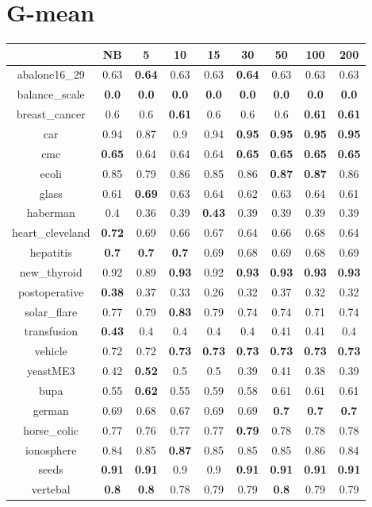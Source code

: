 \documentclass{article}%
\begin{document}
%
\section*{G{-}mean}%
\begin{tabular}{c|cccccccc}%
\hline%
&NB&5&10&15&30&50&100&200\\%
\hline%
abalone16\_29&0.63&\textbf{0.64}&0.63&0.63&\textbf{0.64}&0.63&0.63&0.63\\%
\hline%
balance\_scale&\textbf{0.0}&\textbf{0.0}&\textbf{0.0}&\textbf{0.0}&\textbf{0.0}&\textbf{0.0}&\textbf{0.0}&\textbf{0.0}\\%
\hline%
breast\_cancer&0.6&0.6&\textbf{0.61}&0.6&0.6&0.6&\textbf{0.61}&\textbf{0.61}\\%
\hline%
car&0.94&0.87&0.9&0.94&\textbf{0.95}&\textbf{0.95}&\textbf{0.95}&\textbf{0.95}\\%
\hline%
cmc&\textbf{0.65}&0.64&0.64&0.64&\textbf{0.65}&\textbf{0.65}&\textbf{0.65}&\textbf{0.65}\\%
\hline%
ecoli&0.85&0.79&0.86&0.85&0.86&\textbf{0.87}&\textbf{0.87}&0.86\\%
\hline%
glass&0.61&\textbf{0.69}&0.63&0.64&0.62&0.63&0.64&0.61\\%
\hline%
haberman&0.4&0.36&0.39&\textbf{0.43}&0.39&0.39&0.39&0.39\\%
\hline%
heart\_cleveland&\textbf{0.72}&0.69&0.66&0.67&0.64&0.66&0.68&0.64\\%
\hline%
hepatitis&\textbf{0.7}&\textbf{0.7}&\textbf{0.7}&0.69&0.68&0.69&0.68&0.69\\%
\hline%
new\_thyroid&0.92&0.89&\textbf{0.93}&0.92&\textbf{0.93}&\textbf{0.93}&\textbf{0.93}&\textbf{0.93}\\%
\hline%
postoperative&\textbf{0.38}&0.37&0.33&0.26&0.32&0.37&0.32&0.32\\%
\hline%
solar\_flare&0.77&0.79&\textbf{0.83}&0.79&0.74&0.74&0.71&0.74\\%
\hline%
transfusion&\textbf{0.43}&0.4&0.4&0.4&0.4&0.41&0.41&0.4\\%
\hline%
vehicle&0.72&0.72&\textbf{0.73}&\textbf{0.73}&\textbf{0.73}&\textbf{0.73}&\textbf{0.73}&\textbf{0.73}\\%
\hline%
yeastME3&0.42&\textbf{0.52}&0.5&0.5&0.39&0.41&0.38&0.39\\%
\hline%
bupa&0.55&\textbf{0.62}&0.55&0.59&0.58&0.61&0.61&0.61\\%
\hline%
german&0.69&0.68&0.67&0.69&0.69&\textbf{0.7}&\textbf{0.7}&\textbf{0.7}\\%
\hline%
horse\_colic&0.77&0.76&0.77&0.77&\textbf{0.79}&0.78&0.78&0.78\\%
\hline%
ionosphere&0.84&0.85&\textbf{0.87}&0.85&0.85&0.85&0.86&0.84\\%
\hline%
seeds&\textbf{0.91}&\textbf{0.91}&0.9&0.9&\textbf{0.91}&\textbf{0.91}&\textbf{0.91}&\textbf{0.91}\\%
\hline%
vertebal&\textbf{0.8}&\textbf{0.8}&0.78&0.79&0.79&\textbf{0.8}&0.79&0.79\\%
\hline%
\end{tabular}

%
\end{document}
